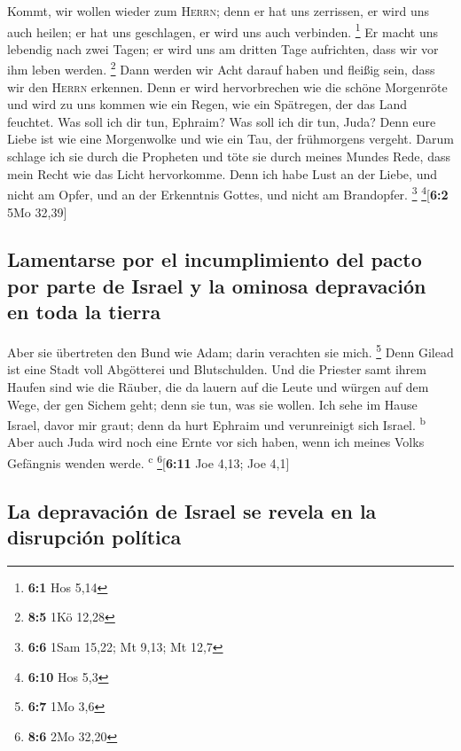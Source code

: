  Kommt, wir wollen wieder zum \textsc{Herrn}; denn er hat
uns zerrissen, er wird uns auch heilen; er hat uns geschlagen, er wird
uns auch verbinden. \footnote{\textbf{6:1} Hos 5,14}  Er
macht uns lebendig nach zwei Tagen; er wird uns am dritten Tage
aufrichten, dass wir vor ihm leben werden. \footnote{\textbf{8:5} 1Kö
  12,28}  Dann werden wir Acht darauf haben und fleißig
sein, dass wir den \textsc{Herrn} erkennen. Denn er wird hervorbrechen
wie die schöne Morgenröte und wird zu uns kommen wie ein Regen, wie ein
Spätregen, der das Land feuchtet.  Was soll ich dir tun,
Ephraim? Was soll ich dir tun, Juda? Denn eure Liebe ist wie eine
Morgenwolke und wie ein Tau, der frühmorgens vergeht. 
Darum schlage ich sie durch die Propheten und töte sie durch meines
Mundes Rede, dass mein Recht wie das Licht hervorkomme. 
Denn ich habe Lust an der Liebe, und nicht am Opfer, und an der
Erkenntnis Gottes, und nicht am Brandopfer. \footnote{\textbf{6:6} 1Sam
  15,22; Mt 9,13; Mt 12,7} \footnote{\textbf{6:10} Hos 5,3}{[}\textbf{6:2}
5Mo 32,39{]}

\hypertarget{lamentarse-por-el-incumplimiento-del-pacto-por-parte-de-israel-y-la-ominosa-depravaciuxf3n-en-toda-la-tierra}{%
\subsection{Lamentarse por el incumplimiento del pacto por parte de
Israel y la ominosa depravación en toda la
tierra}\label{lamentarse-por-el-incumplimiento-del-pacto-por-parte-de-israel-y-la-ominosa-depravaciuxf3n-en-toda-la-tierra}}

 Aber sie übertreten den Bund wie Adam; darin verachten
sie mich. \footnote{\textbf{6:7} 1Mo 3,6}  Denn Gilead ist
eine Stadt voll Abgötterei und Blutschulden.  Und die
Priester samt ihrem Haufen sind wie die Räuber, die da lauern auf die
Leute und würgen auf dem Wege, der gen Sichem geht; denn sie tun, was
sie wollen.  Ich sehe im Hause Israel, davor mir graut;
denn da hurt Ephraim und verunreinigt sich Israel. \textsuperscript{b}
 Aber auch Juda wird noch eine Ernte vor sich haben, wenn
ich meines Volks Gefängnis wenden werde. \textsuperscript{c}
\footnote{\textbf{8:6} 2Mo 32,20}{[}\textbf{6:11} Joe 4,13; Joe 4,1{]}

\hypertarget{la-depravaciuxf3n-de-israel-se-revela-en-la-disrupciuxf3n-poluxedtica}{%
\subsection{La depravación de Israel se revela en la disrupción
política}\label{la-depravaciuxf3n-de-israel-se-revela-en-la-disrupciuxf3n-poluxedtica}}

